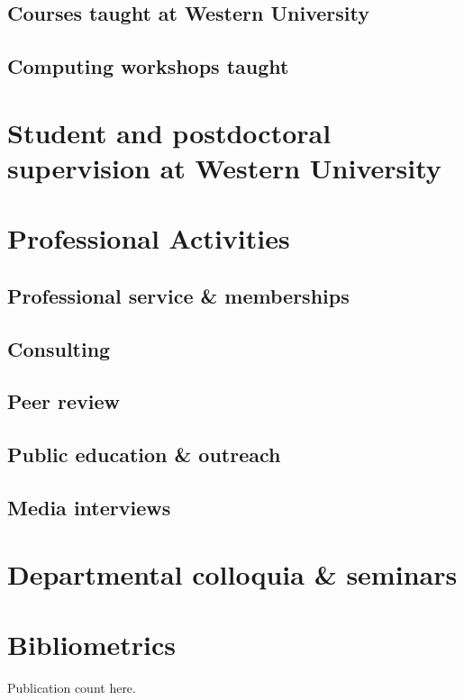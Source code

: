 \documentclass[12pt]{article}
\begin{document}
\subsection{Courses taught at Western University}


\subsection{Computing workshops taught} 


%

\section{Student and postdoctoral supervision at Western University}



\section{Professional Activities}


\subsection{Professional service \& memberships}


\subsection{Consulting}


\subsection{Peer review}


\subsection{Public education \& outreach}


\vspace{0.8cm}
\subsection{Media interviews}



\section{Departmental colloquia \& seminars}



\section{Bibliometrics}

Publication count here.


\end{document}

